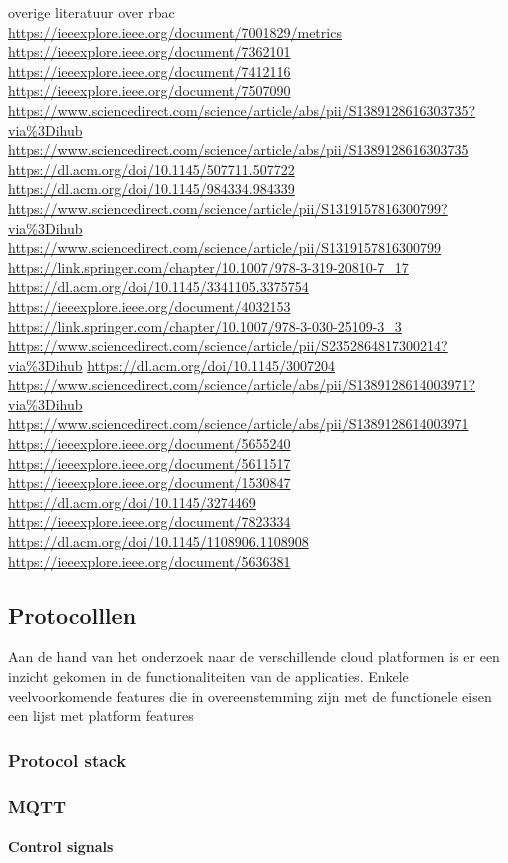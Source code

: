 overige literatuur over rbac
\url{https://ieeexplore.ieee.org/document/7001829/metrics}
\url{https://ieeexplore.ieee.org/document/7362101}
\url{https://ieeexplore.ieee.org/document/7412116}
\url{https://ieeexplore.ieee.org/document/7507090}
\url{https://www.sciencedirect.com/science/article/abs/pii/S1389128616303735?via%3Dihub}
\url{https://www.sciencedirect.com/science/article/abs/pii/S1389128616303735}
\url{https://dl.acm.org/doi/10.1145/507711.507722}
\url{https://dl.acm.org/doi/10.1145/984334.984339}
\url{https://www.sciencedirect.com/science/article/pii/S1319157816300799?via%3Dihub}
\url{https://www.sciencedirect.com/science/article/pii/S1319157816300799}
\url{https://link.springer.com/chapter/10.1007/978-3-319-20810-7_17}
\url{https://dl.acm.org/doi/10.1145/3341105.3375754}
\url{https://ieeexplore.ieee.org/document/4032153}
\url{https://link.springer.com/chapter/10.1007/978-3-030-25109-3_3}
\url{https://www.sciencedirect.com/science/article/pii/S2352864817300214?via%3Dihub}
\url{https://dl.acm.org/doi/10.1145/3007204}
\url{https://www.sciencedirect.com/science/article/abs/pii/S1389128614003971?via%3Dihub}
\url{https://www.sciencedirect.com/science/article/abs/pii/S1389128614003971}
\url{https://ieeexplore.ieee.org/document/5655240}
\url{https://ieeexplore.ieee.org/document/5611517}
\url{https://ieeexplore.ieee.org/document/1530847}
\url{https://dl.acm.org/doi/10.1145/3274469}
\url{https://ieeexplore.ieee.org/document/7823334}
\url{https://dl.acm.org/doi/10.1145/1108906.1108908}
\url{https://ieeexplore.ieee.org/document/5636381}
\subsection{Protocolllen}
Aan de hand van het onderzoek naar de verschillende cloud platformen is er een inzicht gekomen in de functionaliteiten van de applicaties. Enkele veelvoorkomende features die in overeenstemming zijn met de functionele eisen een lijst met platform features

\subsubsection{Protocol stack}



\subsubsection{MQTT}

\paragraph{Control signals}


